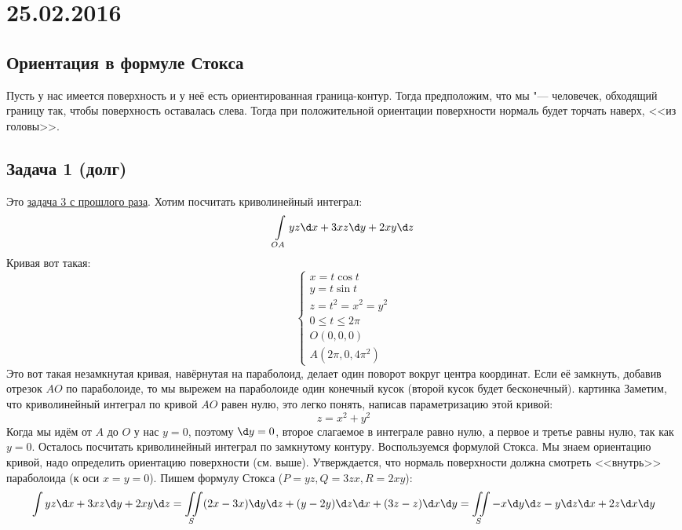 \chapter{25.02.2016}

\section{Ориентация в формуле Стокса}
	Пусть у нас имеется поверхность и у неё есть ориентированная граница-контур.
	Тогда предположим, что мы "--- человечек, обходящий границу так, чтобы поверхность оставалась слева.
	Тогда при положительной ориентации поверхности нормаль будет торчать наверх, <<из головы>>.

\section{Задача 1 (долг)}\label{day160225_task1}
	Это \hyperref[day160218_task3]{задача 3 с прошлого раза}.
	Хотим посчитать криволинейный интеграл:
	\[
		\int\limits_{OA} y z \d x + 3 x z \d y + 2 x y \d z
	\]
	Кривая вот такая:
	\[
		\begin{cases}
			x = t \cos t \\
			y = t \sin t \\
			z = t^2 = x^2=y^2 \\
			0 \le t \le 2 \pi \\
			O(0, 0, 0) \\
			A(2\pi, 0, 4\pi^2)
		\end{cases}
	\]
	Это вот такая незамкнутая кривая, навёрнутая на параболоид, делает один поворот вокруг центра координат.
	Если её замкнуть, добавив отрезок $AO$ по параболоиде, то мы вырежем на параболоиде один конечный кусок (второй кусок будет бесконечный).
	\TODO картинка
	Заметим, что криволинейный интеграл по кривой $AO$ равен нулю, это легко понять, написав параметризацию этой кривой:
	\[ z = x ^ 2 + y ^ 2 \]
	Когда мы идём от $A$ до $O$ у нас $y=0$, поэтому $\d y = 0$, второе слагаемое в интеграле равно нулю,
	а первое и третье равны нулю, так как $y=0$.
	Осталось посчитать криволинейный интеграл по замкнутому контуру.
	Воспользуемся формулой Стокса.
	Мы знаем ориентацию кривой, надо определить ориентацию поверхности (см. выше).
	Утверждается, что нормаль поверхности должна смотреть <<внутрь>> параболоида (к оси $x=y=0$).
	Пишем формулу Стокса ($P=yz, Q=3zx, R=2xy$):
	\[
		\int\limits y z \d x + 3 x z \d y + 2 x y \d z =
		\iint\limits_S
		(2x - 3x) \d y \d z +
		(y - 2y) \d z \d x +
		(3z - z) \d x \d y =
		\iint\limits_S -x\d y \d z - y\d z \d x + 2z \d x \d y
	\]
